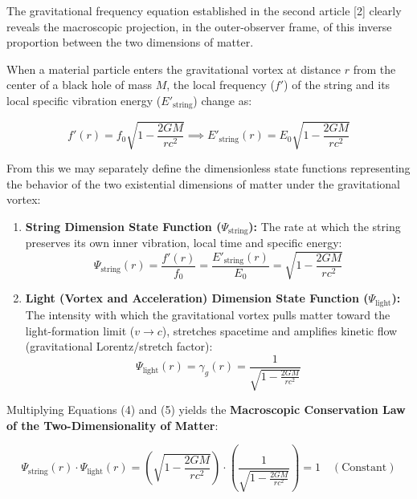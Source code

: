 \documentclass[12pt,a4paper]{article}
\begin{document}
The gravitational frequency equation established in the second article [2] clearly reveals the macroscopic projection, in the outer-observer frame, of this inverse proportion between the two dimensions of matter.

When a material particle enters the gravitational vortex at distance $r$ from the center of a black hole of mass $M$, the local frequency ($f'$) of the string and its local specific vibration energy ($E'_{\text{string}}$) change as:

\begin{equation}
f'(r) = f_0 \sqrt{1 - \frac{2GM}{rc^2}} \implies E'_{\text{string}}(r) = E_0 \sqrt{1 - \frac{2GM}{rc^2}}
\end{equation}

From this we may separately define the dimensionless state functions representing the behavior of the two existential dimensions of matter under the gravitational vortex:

\begin{enumerate}
    \item \textbf{String Dimension State Function ($\Psi_{\text{string}}$):} The rate at which the string preserves its own inner vibration, local time and specific energy:
    \begin{equation}
    \Psi_{\text{string}}(r) = \frac{f'(r)}{f_0} = \frac{E'_{\text{string}}(r)}{E_0} = \sqrt{1 - \frac{2GM}{rc^2}}
    \end{equation}
    \item \textbf{Light (Vortex and Acceleration) Dimension State Function ($\Psi_{\text{light}}$):} The intensity with which the gravitational vortex pulls matter toward the light-formation limit ($v \to c$), stretches spacetime and amplifies kinetic flow (gravitational Lorentz/\allowbreak stretch factor):
    \begin{equation}
    \Psi_{\text{light}}(r) = \gamma_g(r) = \frac{1}{\sqrt{1 - \frac{2GM}{rc^2}}}
    \end{equation}
\end{enumerate}

Multiplying Equations (4) and (5) yields the \textbf{Macroscopic Conservation Law of the Two-Dimensionality of Matter}:

\begin{equation}
\Psi_{\text{string}}(r) \cdot \Psi_{\text{light}}(r) = \left( \sqrt{1 - \frac{2GM}{rc^2}} \right) \cdot \left( \frac{1}{\sqrt{1 - \frac{2GM}{rc^2}}} \right) = 1 \quad (\text{Constant})
\end{equation}
\end{document}
